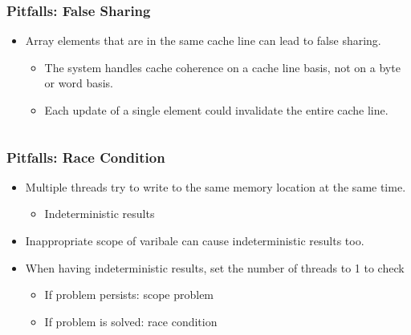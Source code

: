 \documentclass[c,mathserif,compress,xcolor=svgnames]{beamer}
\newenvironment{eblock}[0]
{
\begin{beamerboxesrounded}[upper=uppercol2,lower=lowercol2,shadow=true]}
{\end{beamerboxesrounded}}
\begin{document}
\begin{frame}[fragile]
  \frametitle{\small Pitfalls: False Sharing}
  \begin{itemize}
    \item Array elements that are in the same cache line can lead to false sharing.
    \begin{itemize}
      \item The system handles cache coherence on a cache line basis, not on a byte or word basis.
      \item Each update of a single element could invalidate the entire cache line.
    \end{itemize}
  \end{itemize}
  \begin{columns}
    \begin{eblock}{}
      
    \end{eblock}
  \end{columns}
\end{frame}

\begin{frame}
  \frametitle{\small Pitfalls: Race Condition}
  \begin{itemize}
    \item Multiple threads try to write to the same memory location at the same time.
    \begin{itemize}
      \item Indeterministic results
    \end{itemize}
    \item Inappropriate scope of varibale can cause indeterministic results too.
    \item When having indeterministic results, set the number of threads to 1 to check
    \begin{itemize}
      \item If problem persists: scope problem
      \item If problem is solved: race condition
    \end{itemize}
  \end{itemize}
  \begin{columns}
    \begin{eblock}{}
      
    \end{eblock}
  \end{columns}
\end{frame}
\end{document}
